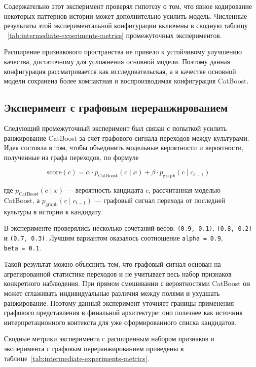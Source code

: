 Содержательно этот эксперимент проверял гипотезу о том, что явное кодирование некоторых паттернов истории может
дополнительно усилить модель. Численные результаты этой экспериментальной конфигурации включены в сводную таблицу
~\ref{tab:intermediate-experiments-metrics} промежуточных экспериментов.

Расширение признакового пространства не привело к устойчивому улучшению качества, достаточному для усложнения основной
модели. Поэтому данная конфигурация рассматривается как исследовательская, а в качестве основной модели сохранена более
компактная и воспроизводимая конфигурация CatBoost.

\subsection{Эксперимент с графовым переранжированием}

Следующий промежуточный эксперимент был связан с попыткой усилить ранжирование CatBoost за счёт графового сигнала
переходов между культурами. Идея состояла в том, чтобы объединить модельные вероятности и вероятности, полученные из
графа переходов, по формуле

\[
\mathrm{score}(c) = \alpha \cdot p_{\mathrm{CatBoost}}(c \mid x) +
\beta \cdot p_{\mathrm{graph}}(c \mid c_{t-1})
\]

где \(p_{\mathrm{CatBoost}}(c \mid x)\) --- вероятность кандидата \(c\), рассчитанная моделью CatBoost,
а \(p_{\mathrm{graph}}(c \mid c_{t-1})\) --- графовый сигнал перехода от последней культуры в истории к кандидату.

В эксперименте проверялись несколько сочетаний весов: \texttt{(0.9,\ 0.1)}, \texttt{(0.8,\ 0.2)} и \texttt{(0.7,\ 0.3)}.
Лучшим вариантом оказалось соотношение \texttt{alpha\ =\ 0.9}, \texttt{beta\ =\ 0.1}.

Такой результат можно объяснить тем, что графовый сигнал основан на агрегированной статистике переходов и не учитывает
весь набор признаков конкретного наблюдения. При прямом смешивании с вероятностями CatBoost он может сглаживать
индивидуальные различия между полями и ухудшать ранжирование. Поэтому данный эксперимент уточняет границы применения
графового представления в финальной архитектуре: оно полезнее как источник интерпретационного контекста для уже
сформированного списка кандидатов.

Сводные метрики эксперимента с расширенным набором признаков и эксперимента с графовым переранжированием приведены в
таблице~\ref{tab:intermediate-experiments-metrics}.

